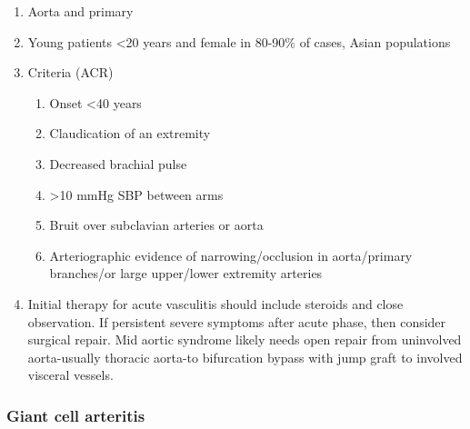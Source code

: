 \documentclass[
]{book}
\begin{document}
\begin{enumerate}
\def\labelenumi{\arabic{enumi}.}
\item
  Aorta and primary\citep{ehlert2019}
\item
  Young patients \textless20 years and female in 80-90\% of cases, Asian
  populations
\item
  Criteria (ACR)

  \begin{enumerate}
  \def\labelenumii{\arabic{enumii}.}
  \item
    Onset \textless40 years
  \item
    Claudication of an extremity
  \item
    Decreased brachial pulse
  \item
    \textgreater10 mmHg SBP between arms
  \item
    Bruit over subclavian arteries or aorta
  \item
    Arteriographic evidence of narrowing/occlusion in aorta/primary
    branches/or large upper/lower extremity arteries
  \end{enumerate}
\item
  Initial therapy for acute vasculitis should include steroids and
  close observation. If persistent severe symptoms after acute phase,
  then consider surgical repair. Mid aortic syndrome likely needs open
  repair from uninvolved aorta-usually thoracic aorta-to bifurcation
  bypass with jump graft to involved visceral vessels.\citep{ehlert2019}
\end{enumerate}

\hypertarget{giant-cell-arteritis}{%
\subsubsection{Giant cell arteritis}\label{giant-cell-arteritis}}
\end{document}
